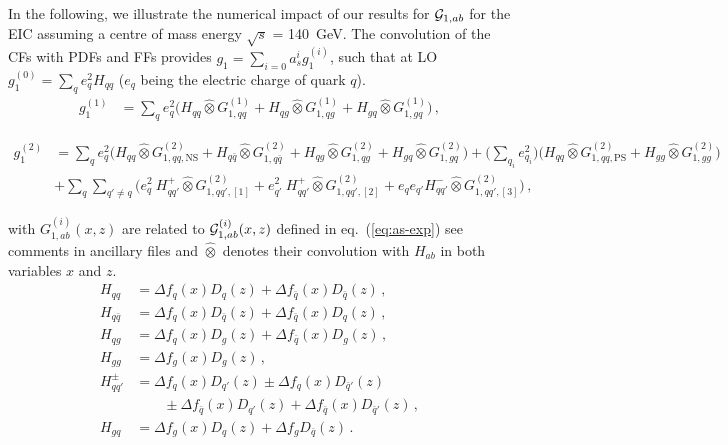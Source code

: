 \documentclass[%
 twocolumn,
 superscriptaddress,
 preprintnumbers,
 nofootinbib,
 amsmath,amssymb,
 aps,
 prl,
]{revtex4}
\begin{document}
{ 
In the following, we illustrate the numerical impact of  our results for ${\cal G}_{1,ab}$ for the EIC assuming a centre of mass energy $\sqrt{s}$ = 140~GeV.
The convolution of the CFs with PDFs and FFs provides $g_1 = \sum_{i=0} a_s^i g_1^{(i)}$, such that 
at LO $g_1^{(0)}=\sum_{q} e_{q}^{2} H_{qq}$ ($e_q$ being the electric charge of quark $q$).
% 
\begin{align}
g_1^{(1)} & = \sum_{q} e_{q}^{2}\bigg(  H_{qq}\hat \otimes G_{1,qq}^{(1)} + H_{qg} \hat \otimes G_{1,qg}^{(1)} + H_{gq} \hat \otimes G_{1,gq}^{(1)} \bigg) 
\, ,
\end{align}
\begin{widetext}
\begin{align}
g_1^{(2)} &= \sum_{q} e_{q}^{2}\bigg(  H_{qq}\hat \otimes G_{1,qq,\text{NS}}^{(2)} + H_{q\bar{q}}\hat \otimes  G_{1,q\bar{q}}^{(2)} + H_{qg} \hat \otimes G_{1,qg}^{(2)} + H_{gq} \hat \otimes G_{1,gq}^{(2)} \bigg) +
\Big(\sum_{q_i} e_{q_i}^{2}\Big)\bigg( H_{qq}\hat \otimes G_{1,qq,\text{PS}}^{(2)}  + H_{gg} \hat \otimes G_{1,gg}^{(2)} \bigg) \nonumber\\
&+ \sum_{q} \sum_{q'\neq q}\bigg( e_{q}^{2}~H^{+}_{qq'} \hat \otimes  G_{1,qq',[1]}^{(2)} + e_{q'}^{2}~H^{+}_{qq'}\hat \otimes  G_{1,qq',[2]}^{(2)} + e_{q}e_{q'} H^{-}_{qq'} \hat \otimes G_{1,qq',[3]}^{(2)}\bigg)
\, ,
\end{align}
\end{widetext} 
%
with ${G}^{(i)}_{1,ab}(x,z)$ are related to ${\cal G}^{(i)}_{1,ab}(x,z)$ defined in eq.~(\ref{eq:as-exp}) see comments in ancillary files and  $\hat\otimes$ denotes their convolution with $H_{ab}$ in both variables $x$ and $z$.
% 
\begin{align}
H_{qq} &= \Delta f_q(x) D_q(z) + \Delta f_{\bar{q}} (x)D_{\bar{q}}(z)\, , \nonumber\\ 
H_{q\bar{q}} &= \Delta f_q (x) D_{\bar{q}} (z)+ \Delta f_{\bar{q}}(x) D_q(z)\, , \nonumber\\
H_{qg} &= \Delta f_q (x) D_g (z)+\Delta f_{\bar{q}}(x) D_g (z)\, , \nonumber\\
H_{gg} &= \Delta f_g (x)D_g(z)\, , \nonumber\\
H^{\pm}_{qq'} &= \Delta f_q (x)D_{q'}(z) \pm \Delta f_q (x)D_{\bar{q}'}(z) \nonumber\\ 
& \qquad \pm  \Delta f_{\bar{q}} (x)D_{q'}(z)+  \Delta f_{\bar{q}} (x) D_{\bar{q}'}(z)\, , \nonumber\\
H_{gq} &= \Delta f_g (x) D_q (z) +  \Delta f_g D_{\bar{q}}(z)\, .  
\end{align}
%

}
\end{document}
